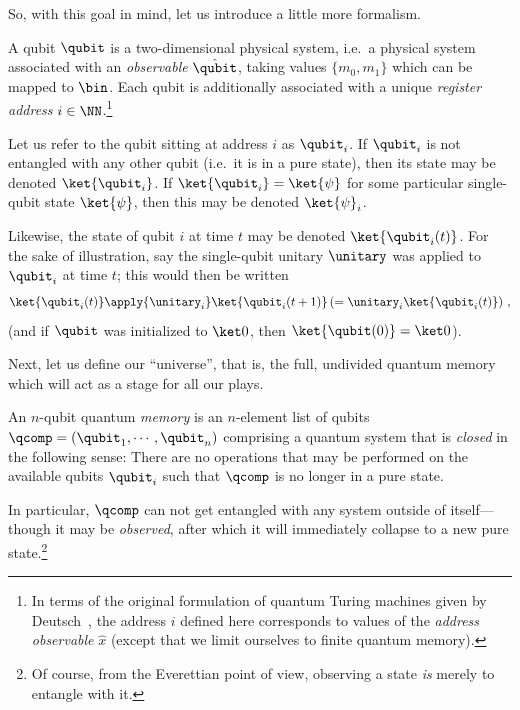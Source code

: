     So, with this goal in mind, let us introduce a little more formalism.

    \begin{definition}[Qubit]\label{def:qubit}
      A qubit $\qubit$ is a two-dimensional physical system, i.e.\ a physical
      system associated with an \emph{observable} $\hat{\qubit}$, taking values
      $\{m_0,m_1\}$ which can be mapped to $\bin$. Each qubit is additionally
      associated with 
      a unique \emph{register address} $i \in \NN$.\footnote{
        In terms of the original formulation of quantum Turing machines given by
        Deutsch~\cite{Deutsch85}, the address $i$ defined here corresponds
        to values of the \emph{address observable} $\hat{x}$
        (except that we limit ourselves to finite quantum memory).
      }     
    \end{definition}

    \noindent
    Let us refer to the qubit sitting at address $i$ as $\qubit_i$.
      If $\qubit_i$ is not entangled with any
      other qubit (i.e.\ it is in a pure state), then its state may be denoted
      $\ket{\qubit_i}$. If
      $\ket{\qubit_i} = \ket{\psi}$ for some particular single-qubit
      state $\ket{\psi}$, then this may be denoted $\ket{\psi}_i$. 

    Likewise,
      the state of qubit $i$ at time $t$ may be denoted $\ket{\qubit_i(t)}$.
      For the sake of illustration, say 
      the single-qubit unitary $\unitary$ was applied to $\qubit_i$ at time
      $t$; this would then be written 
      \[
        \ket{\qubit_i(t)} \apply{\unitary_i} \ket{\qubit_i(t+1)} \left( =
        \unitary_i \ket{\qubit_i(t)} \right)\, ,
      \]
      (and if $\qubit$ was initialized to $\ket0$, then $\ket{\qubit(0)} = \ket0$).

    Next, let us define our ``universe'', that is, the full, undivided quantum memory 
      which will act as a stage for all our plays.

    \begin{definition}\label{def:memory}
      An $n$-qubit quantum \emph{memory} is an $n$-element list of qubits $\qcomp =
      (\qubit_1, \cdots, \qubit_n)$ comprising a quantum
      system that is \emph{closed} in the following sense: 
      There are no operations that may be performed on the available qubits $\qubit_i$
      such that $\qcomp$ is no longer in a pure state.
    \end{definition}

    \noindent
    In particular, $\qcomp$ can not get entangled with any
      system outside of itself---though it may be \emph{observed}, after which
      it will immediately collapse to a new pure state.\footnote{
        Of course, from the Everettian point of view, observing a state
        \emph{is} merely to entangle with it.
      }         

